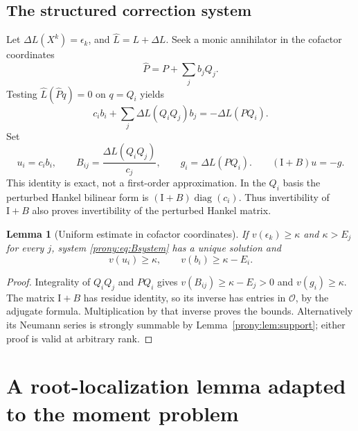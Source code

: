 \documentclass[11pt,letterpaper]{article}
\newtheorem{lemma}[theorem]{Lemma}
\theoremstyle{definition}
\theoremstyle{remark}
\newcommand{\Ocal}{\mathcal O}
\newcommand{\Ph}{\widehat P}
\newcommand{\Lh}{\widehat L}
\newcommand{\Id}{\mathrm I}
\DeclareMathOperator{\diag}{diag}
\begin{document}
\subsection{The structured correction system}
Let $\Delta L(X^k)=\epsilon_k$, and $\Lh=L+\Delta L$. Seek a monic
annihilator in the cofactor coordinates
\begin{equation}\label{prony:eq:Ph}
 \Ph=P+\sum_j b_jQ_j.
\end{equation}
Testing $\Lh(\Ph q)=0$ on $q=Q_i$ yields
\[
 c_i b_i+\sum_j\Delta L(Q_iQ_j)b_j=-\Delta L(PQ_i).
\]
Set
\begin{equation}\label{prony:eq:Bsystem}
 u_i=c_i b_i,\qquad
 B_{ij}=\frac{\Delta L(Q_iQ_j)}{c_j},\qquad
 g_i=\Delta L(PQ_i).
 \qquad (\Id+B)u=-g.
\end{equation}
This identity is exact, not a first-order approximation. In the $Q_i$
basis the perturbed Hankel bilinear form is
$(\Id+B)\diag(c_i)$. Thus invertibility of $\Id+B$ also proves invertibility
of the perturbed Hankel matrix.

\begin{lemma}[Uniform estimate in cofactor coordinates]\label{prony:lem:cofactorbound}
If $v(\epsilon_k)\ge\kappa$ and $\kappa>E_j$ for every $j$, system
\eqref{prony:eq:Bsystem} has a unique solution and
\begin{equation}\label{prony:eq:bprecision}
 v(u_i)\ge\kappa,\qquad v(b_i)\ge\kappa-E_i.
\end{equation}
\end{lemma}
\begin{proof}
Integrality of $Q_iQ_j$ and $PQ_i$ gives
$v(B_{ij})\ge\kappa-E_j>0$ and $v(g_i)\ge\kappa$.
The matrix $\Id+B$ has residue identity, so its inverse has entries in
$\Ocal$, by the adjugate formula. Multiplication by that inverse proves the
bounds. Alternatively its Neumann series is strongly summable by
Lemma~\ref{prony:lem:support}; either proof is valid at arbitrary rank.
\end{proof}

\section{A root-localization lemma adapted to the moment problem}
\label{prony:sec:roots}
\end{document}
